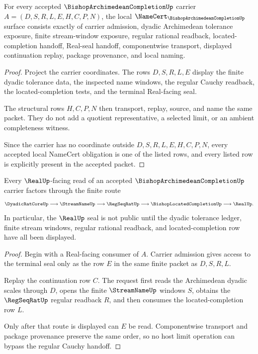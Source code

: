 \begin{theorem}
\label{thm:bishop-archimedean-completion-namecert-obligations}
For every accepted $\BishopArchimedeanCompletionUp$ carrier $A=(D,S,R,L,E,H,C,P,N)$, the local $\NameCert_{\BishopArchimedeanCompletionUp}$ surface consists exactly of carrier admission, dyadic Archimedean tolerance exposure, finite stream-window exposure, regular rational readback, located-completion handoff, Real-seal handoff, componentwise transport, displayed continuation replay, package provenance, and local naming.
\end{theorem}
\begin{proof}
Project the carrier coordinates. The rows $D,S,R,L,E$ display the finite dyadic tolerance data, the inspected name windows, the regular Cauchy readback, the located-completion tests, and the terminal Real-facing seal.

The structural rows $H,C,P,N$ then transport, replay, source, and name the same packet. They do not add a quotient representative, a selected limit, or an ambient completeness witness.

Since the carrier has no coordinate outside $D,S,R,L,E,H,C,P,N$, every accepted local NameCert obligation is one of the listed rows, and every listed row is explicitly present in the accepted packet.
\end{proof}

\begin{theorem}
\label{thm:bishop-archimedean-completion-regular-cauchy-handoff}
Every $\RealUp$-facing read of an accepted $\BishopArchimedeanCompletionUp$ carrier factors through the finite route
$$
\DyadicRatCoreUp \longrightarrow \StreamNameUp \longrightarrow \RegSeqRatUp \longrightarrow \BishopLocatedCompletionUp \longrightarrow \RealUp .
$$
In particular, the $\RealUp$ seal is not public until the dyadic tolerance ledger, finite stream windows, regular rational readback, and located-completion row have all been displayed.
\end{theorem}
\begin{proof}
Begin with a Real-facing consumer of $A$. Carrier admission gives access to the terminal seal only as the row $E$ in the same finite packet as $D,S,R,L$.

Replay the continuation row $C$. The request first reads the Archimedean dyadic scales through $D$, opens the finite $\StreamNameUp$ windows $S$, obtains the $\RegSeqRatUp$ regular readback $R$, and then consumes the located-completion row $L$.

Only after that route is displayed can $E$ be read. Componentwise transport and package provenance preserve the same order, so no host limit operation can bypass the regular Cauchy handoff.
\end{proof}

